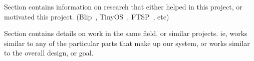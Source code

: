 Section contains information on research that either helped in this project, or motivated this project. (Blip~\cite{bib:blip}, TinyOS~\cite{bib:tinyos2}, FTSP~\cite{bib:ftsp}, etc)

Section contains details on work in the same field, or similar projects. ie, works similar to any of the particular parts that make up our system, or works similar to the overall design, or goal.
